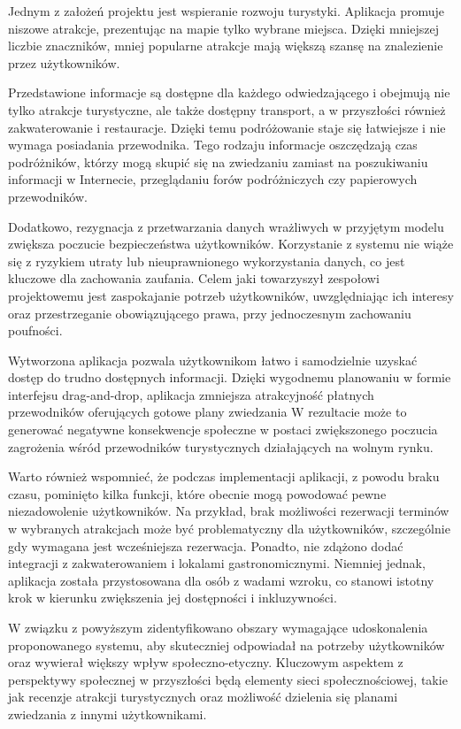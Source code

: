\indent Jednym z założeń projektu jest wspieranie rozwoju turystyki.
Aplikacja promuje niszowe atrakcje, prezentując na mapie tylko wybrane miejsca.
Dzięki mniejszej liczbie znaczników, mniej popularne atrakcje mają większą szansę na znalezienie przez użytkowników.

\indent Przedstawione informacje są dostępne dla każdego odwiedzającego i obejmują nie tylko atrakcje turystyczne, ale także dostępny transport, a w przyszłości również zakwaterowanie i restauracje.
Dzięki temu podróżowanie staje się łatwiejsze i nie wymaga posiadania przewodnika.
Tego rodzaju informacje oszczędzają czas podróżników, którzy mogą skupić się na zwiedzaniu zamiast na poszukiwaniu informacji w Internecie, przeglądaniu forów podróżniczych czy papierowych przewodników.

\indent Dodatkowo, rezygnacja z przetwarzania danych wrażliwych w przyjętym modelu zwiększa poczucie bezpieczeństwa użytkowników.
Korzystanie z systemu nie wiąże się z ryzykiem utraty lub nieuprawnionego wykorzystania danych, co jest kluczowe dla zachowania zaufania.
Celem jaki towarzyszył zespołowi projektowemu jest zaspokajanie potrzeb użytkowników, uwzględniając ich interesy oraz przestrzeganie obowiązującego prawa, przy jednoczesnym zachowaniu poufności.

\indent Wytworzona aplikacja pozwala użytkownikom łatwo i samodzielnie uzyskać dostęp do trudno dostępnych informacji.
Dzięki wygodnemu planowaniu w formie interfejsu drag-and-drop, aplikacja zmniejsza atrakcyjność płatnych przewodników oferujących gotowe plany zwiedzania
W rezultacie może to generować negatywne konsekwencje społeczne w postaci zwiększonego poczucia zagrożenia wśród przewodników turystycznych działających na wolnym rynku.

\indent Warto również wspomnieć, że podczas implementacji aplikacji, z powodu braku czasu, pominięto kilka funkcji, które obecnie mogą powodować pewne niezadowolenie użytkowników.
Na przykład, brak możliwości rezerwacji terminów w wybranych atrakcjach może być problematyczny dla użytkowników, szczególnie gdy wymagana jest wcześniejsza rezerwacja.
Ponadto, nie zdążono dodać integracji z zakwaterowaniem i lokalami gastronomicznymi.
Niemniej jednak, aplikacja została przystosowana dla osób z wadami wzroku, co stanowi istotny krok w kierunku zwiększenia jej dostępności i inkluzywności.

\indent W związku z powyższym zidentyfikowano obszary wymagające udoskonalenia proponowanego systemu, aby skuteczniej odpowiadał na potrzeby użytkowników oraz wywierał większy wpływ społeczno-etyczny.
Kluczowym aspektem z perspektywy społecznej w przyszłości będą elementy sieci społecznościowej, takie jak recenzje atrakcji turystycznych oraz możliwość dzielenia się planami zwiedzania z innymi użytkownikami.

